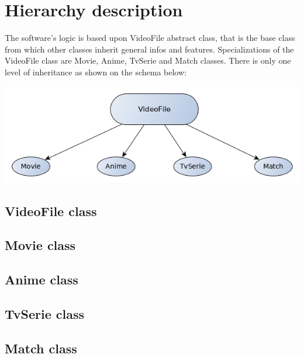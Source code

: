 \section{Hierarchy description}

The software's logic is based upon VideoFile abstract class, that is the base class from which other classes inherit general infos and features. Specializations of the VideoFile class are Movie, Anime, TvSerie and Match classes. There is only one level of inheritance as shown on the schema below: \\

\begin{center}
\includegraphics[scale=0.65]{Img/Hierarchy.png}
\end{center}

\subsection{VideoFile class}

\subsection{Movie class}

\subsection{Anime class}

\subsection{TvSerie class}

\subsection{Match class}

